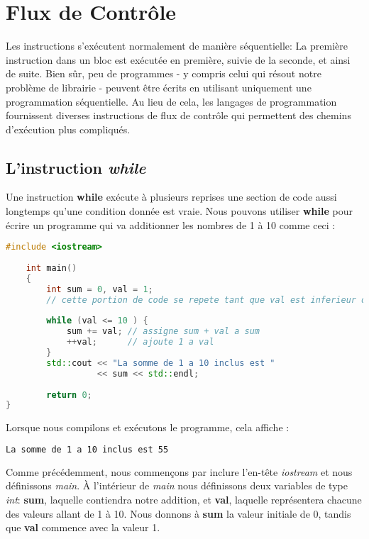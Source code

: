 \section{Flux de Contrôle}
Les instructions s'exécutent normalement de manière séquentielle: La première instruction dans un bloc est exécutée en première, suivie de la seconde, et ainsi de suite. Bien sûr, peu de programmes - y compris celui qui résout notre problème de librairie - peuvent être écrits en utilisant uniquement une programmation séquentielle. Au lieu de cela, les langages de programmation fournissent diverses instructions de flux de contrôle qui permettent des chemins d'exécution plus compliqués.

\subsection{L'instruction \textit{while}}
Une instruction \textbf{while} exécute à plusieurs reprises une section de code aussi longtemps qu'une condition donnée est vraie. Nous pouvons utiliser \textbf{while} pour écrire un programme qui va additionner les nombres de 1 à 10 comme ceci : 

	\medbreak
\begin{lstlisting}[language=C++]
	#include <iostream>
	
	int main()
	{
		int sum = 0, val = 1;
		// cette portion de code se repete tant que val est inferieur ou egale a 10
		
		while (val <= 10 ) {
			sum += val; // assigne sum + val a sum
			++val;      // ajoute 1 a val	
		}
		std::cout << "La somme de 1 a 10 inclus est "
				  << sum << std::endl;
				  
		return 0;
}
\end{lstlisting}
\medbreak

Lorsque nous compilons et exécutons le programme, cela affiche :

\medbreak
\begin{lstlisting}[language=Bash]
	La somme de 1 a 10 inclus est 55
\end{lstlisting}
\medbreak

Comme précédemment, nous commençons par inclure l'en-tête \textit{iostream} et nous définissons \textit{main}. À l'intérieur de \textit{main} nous définissons deux variables de type \textit{int}: \textbf{sum}, laquelle contiendra notre addition, et \textbf{val}, laquelle représentera chacune des valeurs allant de 1 à 10. Nous donnons à \textbf{sum} la valeur initiale de 0, tandis que \textbf{val} commence avec la valeur 1. 

